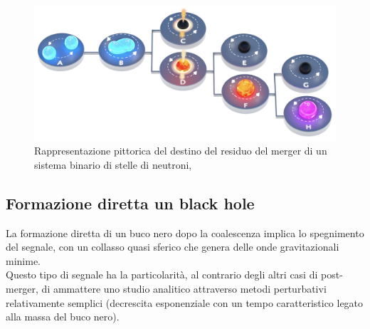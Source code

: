 \vspace{0pt}
\begin{figure}
	\includegraphics[scale=0.2]{figures/Capitolo_1/MagnetarEvolution.png}
	\captionsetup{width=0.8\textwidth}
	\caption{Rappresentazione pittorica del destino del residuo del merger di un sistema binario di stelle di neutroni, \cite{sarin2020evolution}}
	\label{fig:EvoluzioneBNS}
	\vspace{-20pt}
\end{figure}

\subsection{Formazione diretta un black hole}	
\label{subsection:Diretto_Black_hole}

La formazione diretta di un buco nero dopo la coalescenza implica lo spegnimento del segnale, con un collasso quasi sferico che genera delle onde gravitazionali minime\cite{sarin2020evolution}.\\
Questo tipo di segnale ha la particolarità, al contrario degli altri casi di post-merger, di ammattere uno studio analitico attraverso metodi perturbativi relativamente semplici (decrescita esponenziale con un tempo caratteristico legato alla massa del buco nero)\cite{maggiore2018gravitational}.

